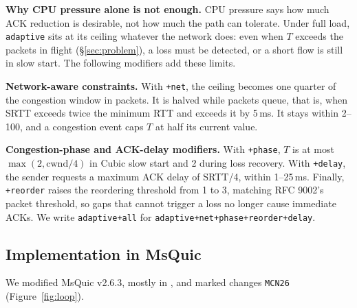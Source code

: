 \documentclass[11pt]{article}
\newcommand{\pol}[1]{\texttt{#1}}            %
\newcommand{\para}[1]{\textbf{#1}} %
\newcommand{\ms}{\,ms}
\begin{document}
\para{Why CPU pressure alone is not enough.} CPU pressure says how much ACK reduction is
desirable, not how much the path can tolerate. Under full load, \pol{adaptive} sits at its
ceiling whatever the network does: even when $T$ exceeds the packets in flight (\S\ref{sec:problem}), a loss must
be detected, or a short flow is still in slow start. The following modifiers add these limits.

\para{Network-aware constraints.} With \pol{+net}, the ceiling becomes one quarter of the
congestion window in packets. It is halved while packets queue, that is, when SRTT exceeds twice
the minimum RTT and exceeds it by 5\ms. It stays within 2--100, and a congestion event caps $T$ at
half its current value.

\para{Congestion-phase and ACK-delay modifiers.} With \pol{+phase}, $T$ is at most
$\max(2, \mathrm{cwnd}/4)$ in Cubic slow start and 2 during loss recovery. With \pol{+delay}, the
sender requests a maximum ACK delay of SRTT/4, within 1--25\ms. Finally, \pol{+reorder} raises
the reordering threshold from 1 to 3, matching RFC 9002's packet threshold, so gaps that cannot
trigger a loss no longer cause immediate ACKs. We write \pol{adaptive+all} for
\pol{adaptive+net+phase+reorder+delay}.

\subsection{Implementation in MsQuic}
We modified MsQuic v2.6.3, mostly in , and marked changes \pol{MCN26}
(Figure~\ref{fig:loop}).
\end{document}
